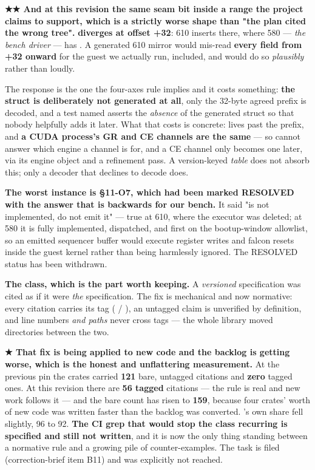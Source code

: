 \documentclass[10.5pt]{article}
\begin{document}
\begin{warnbox}\small
\textbf{★★ And at this revision the same seam bit inside a range the project claims to support,
which is a strictly worse shape than "the plan cited the wrong tree".}
 \textbf{diverges at offset +32}: 610 inserts
 there, where 580 — \emph{the bench driver} — has . A
generated 610 mirror would mis-read \textbf{every field from +32 onward} for the guest we actually
run,  included, and would do so \emph{plausibly} rather than loudly.

\smallskip
The response is the one the four-axes rule implies and it costs something: \textbf{the struct is
deliberately not generated at all}, only the 32-byte agreed prefix is decoded, and a test named
 asserts the
\emph{absence} of the generated struct so that nobody helpfully adds it later. What that costs is
concrete:  lives past the prefix, and \textbf{a CUDA process's GR and CE channels
are the same } — so  cannot answer which engine a channel is
for, and a CE channel only becomes one later, via its engine object and a refinement pass. A
version-keyed \emph{table} does not absorb this; only a decoder that declines to decode does.
\end{warnbox}

\textbf{The worst instance is \S11-O7, which had been marked RESOLVED with the answer that is
backwards for our bench.} It said  "is not implemented, do not emit
it" — true at 610, where the executor was deleted; at 580 it is fully implemented, dispatched, and
first on the bootup-window allowlist, so an emitted sequencer buffer would execute register writes
and falcon resets inside the guest kernel rather than being harmlessly ignored. The RESOLVED
status has been withdrawn.

\textbf{The class, which is the part worth keeping.} A \emph{versioned} specification was cited as
if it were \emph{the} specification. The fix is mechanical and now normative: every citation
carries its tag ( / ), an untagged claim is unverified by
definition, and line numbers \emph{and paths} never cross tags — the whole  library
moved directories between the two.

\textbf{★ That fix is being applied to new code and the backlog is getting worse, which is the
honest and unflattering measurement.} At the previous pin the crates carried \textbf{121} bare,
untagged  citations and \textbf{zero} tagged ones. At this revision there are
\textbf{56 tagged} citations — the rule is real and new work follows it — and the bare count has
risen to \textbf{159}, because four crates' worth of new code was written faster than the backlog
was converted. 's own share fell slightly, 96 to 92. \textbf{The CI grep that
would stop the class recurring is specified and still not written}, and it is now the only thing
standing between a normative rule and a growing pile of counter-examples. The task is filed
(correction-brief item B11) and was explicitly not reached.
\end{document}
